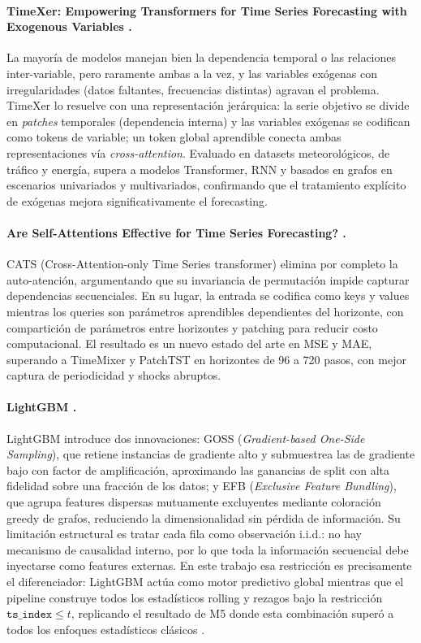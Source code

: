 \documentclass{article}
\begin{document}
\paragraph{TimeXer: Empowering Transformers for Time Series Forecasting with Exogenous Variables \citep{wang2024timexer}.}
La mayoría de modelos manejan bien la dependencia temporal o las relaciones inter-variable, pero raramente ambas a la vez, y las variables exógenas con irregularidades (datos faltantes, frecuencias distintas) agravan el problema. TimeXer lo resuelve con una representación jerárquica: la serie objetivo se divide en \textit{patches} temporales (dependencia interna) y las variables exógenas se codifican como tokens de variable; un token global aprendible conecta ambas representaciones vía \textit{cross-attention}. Evaluado en datasets meteorológicos, de tráfico y energía, supera a modelos Transformer, RNN y basados en grafos en escenarios univariados y multivariados, confirmando que el tratamiento explícito de exógenas mejora significativamente el forecasting.

\paragraph{Are Self-Attentions Effective for Time Series Forecasting? \citep{kim2024cats}.}
CATS (Cross-Attention-only Time Series transformer) elimina por completo la auto-atención, argumentando que su invariancia de permutación impide capturar dependencias secuenciales. En su lugar, la entrada se codifica como keys y values mientras los queries son parámetros aprendibles dependientes del horizonte, con compartición de parámetros entre horizontes y patching para reducir costo computacional. El resultado es un nuevo estado del arte en MSE y MAE, superando a TimeMixer y PatchTST en horizontes de 96 a 720 pasos, con mejor captura de periodicidad y shocks abruptos.

\paragraph{LightGBM \citep{ke2017lightgbm}.}
LightGBM introduce dos innovaciones: GOSS (\textit{Gradient-based One-Side Sampling}), que retiene instancias de gradiente alto y submuestrea las de gradiente bajo con factor de amplificación, aproximando las ganancias de split con alta fidelidad sobre una fracción de los datos; y EFB (\textit{Exclusive Feature Bundling}), que agrupa features dispersas mutuamente excluyentes mediante coloración greedy de grafos, reduciendo la dimensionalidad sin pérdida de información. Su limitación estructural es tratar cada fila como observación i.i.d.: no hay mecanismo de causalidad interno, por lo que toda la información secuencial debe inyectarse como features externas. En este trabajo esa restricción es precisamente el diferenciador: LightGBM actúa como motor predictivo global mientras que el pipeline construye todos los estadísticos rolling y rezagos bajo la restricción $\texttt{ts\_index} \leq t$, replicando el resultado de M5 donde esta combinación superó a todos los enfoques estadísticos clásicos \citep{makridakis2022m5, m5first2020}.
\end{document}
